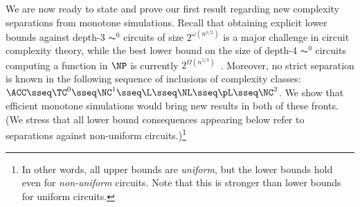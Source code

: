 \documentclass[11pt]{article}
\begin{document}
We are now ready to state and prove our first result regarding
new complexity separations from monotone simulations. Recall that obtaining explicit lower bounds against depth-$3$ $\AC^0$  circuits of size $2^{\omega(n^{1/2})}$ is a major challenge in circuit complexity theory, while the best lower bound on the size of depth-4 $\AC^0$ circuits
computing a function in $\NP$ is
currently $2^{\Omega(n^{1/3})}$~\cite{DBLP:conf/stoc/Hastad86}.
Moreover, no strict separation is known in the following sequence of inclusions
of complexity classes:
$\ACC \sseq \TC^0 \sseq \NC^1 \sseq \L \sseq \NL \sseq \pL \sseq \NC^2$.
We show that 
efficient monotone simulations would bring new results in both of these
fronts. 
(We stress that all lower bound consequences appearing below refer to
separations against non-uniform circuits.)\footnote{In other words, all upper bounds are
\emph{uniform}, but the lower bounds hold even for \emph{non-uniform}
circuits. Note that this is stronger than lower bounds for uniform
circuits.}
 
\end{document}
